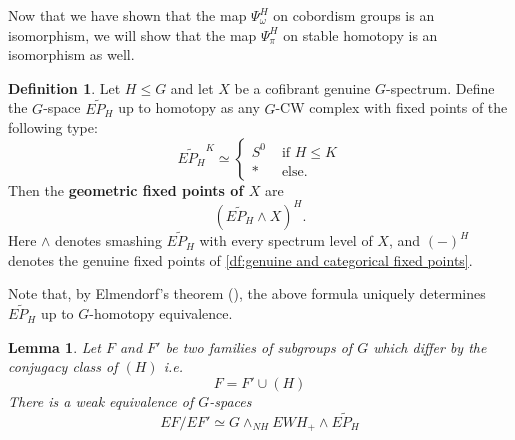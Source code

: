 \documentclass[11pt]{amsart}
\theoremstyle{plain}   %
\newtheorem{lem}[thm]{Lemma}
\theoremstyle{definition}
\newtheorem{df}[thm]{Definition}
\theoremstyle{remark}
\numberwithin{equation}{section}
\begin{document}
Now that we have shown that the map $\Psi_\omega^H$ on cobordism groups is an isomorphism, we will show that the map $\Psi_\pi^H$ on stable homotopy is an isomorphism as well. 

\begin{df}\label{df:geometric fixed points}
Let $H\leq G$ and let $X$ be a cofibrant genuine $G$-spectrum. Define the $G$-space $\widetilde{EP_H}$ up to homotopy as any $G$-CW complex with fixed points of the following type:
\[
\widetilde{EP_H}^K \simeq\begin{cases}
S^0 & \text{ if } H\leq K\\
* & \text{ else. }
\end{cases}
\]
Then the \textbf{geometric fixed points of $X$} are 
\[
(\widetilde{EP_H} \wedge X)^{H}.
\]
Here $\wedge$ denotes smashing $\widetilde{EP_H}$ with every spectrum level of $X$, and $(-)^H$ denotes the genuine fixed points of \cref{df:genuine and categorical fixed points}. 
\end{df}

Note that, by Elmendorf's theorem (\cite{elmendorf83}), the above formula uniquely determines $\widetilde{EP_H}$ up to $G$-homotopy equivalence.

\begin{lem}\label{lem:quotient space}
Let $F$ and $F'$ be two families of subgroups of $G$ which differ by the conjugacy class of $(H)$ i.e.
\[
F= F'\cup (H)
\]
There is a weak equivalence of $G$-spaces
\[
EF/EF' \simeq G\wedge_{NH} EWH_+ \wedge \widetilde{EP_H}
\]
\end{lem}
\end{document}
